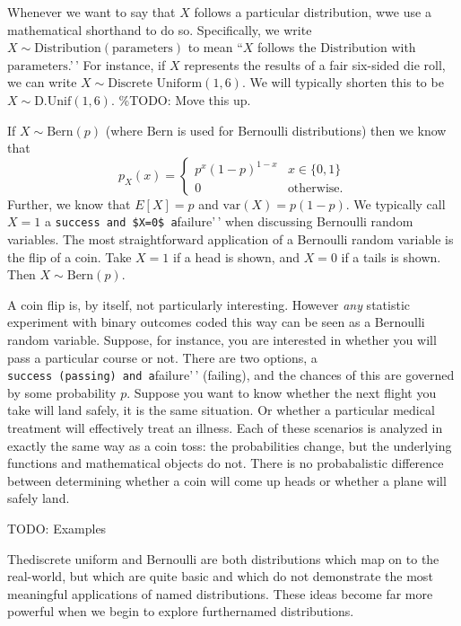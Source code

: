 \documentclass[
  letterpaper,
  DIV=11,
  numbers=noendperiod]{scrreprt}
\begin{document}
Whenever we want to say that \(X\) follows a particular distribution,
wwe use a mathematical shorthand to do so. Specifically, we write
\(X \sim \text{Distribution}(\text{parameters})\) to mean ``\(X\)
follows the \(\text{Distribution}\) with \(\text{parameters}\).'\,' For
instance, if \(X\) represents the results of a fair six-sided die roll,
we can write \(X\sim\text{Discrete Uniform}(1,6)\). We will typically
shorten this to be \(X\sim\text{D.Unif}(1,6)\). \%TODO: Move this up.

If \(X\sim\text{Bern}(p)\) (where \(\text{Bern}\) is used for Bernoulli
distributions) then we know that
\[p_X(x) = \begin{cases} p^x(1-p)^{1-x} & x\in\{0,1\}\\ 0 & \text{otherwise}.\end{cases}\]
Further, we know that \(E[X] = p\) and \(\text{var}(X) = p(1-p)\). We
typically call \(X=1\) a
\texttt{success\textquotesingle{}\textquotesingle{}\ and\ \$X=0\$\ a}failure'\,'
when discussing Bernoulli random variables. The most straightforward
application of a Bernoulli random variable is the flip of a coin. Take
\(X=1\) if a head is shown, and \(X=0\) if a tails is shown. Then
\(X\sim\text{Bern}(p)\).

A coin flip is, by itself, not particularly interesting. However
\emph{any} statistic experiment with binary outcomes coded this way can
be seen as a Bernoulli random variable. Suppose, for instance, you are
interested in whether you will pass a particular course or not. There
are two options, a
\texttt{success\textquotesingle{}\textquotesingle{}\ (passing)\ and\ a}failure'\,'
(failing), and the chances of this are governed by some probability
\(p\). Suppose you want to know whether the next flight you take will
land safely, it is the same situation. Or whether a particular medical
treatment will effectively treat an illness. Each of these scenarios is
analyzed in exactly the same way as a coin toss: the probabilities
change, but the underlying functions and mathematical objects do not.
There is no probabalistic difference between determining whether a coin
will come up heads or whether a plane will safely land.

TODO: Examples

Thediscrete uniform and Bernoulli are both distributions which map on to
the real-world, but which are quite basic and which do not demonstrate
the most meaningful applications of named distributions. These ideas
become far more powerful when we begin to explore furthernamed
distributions.
\end{document}
